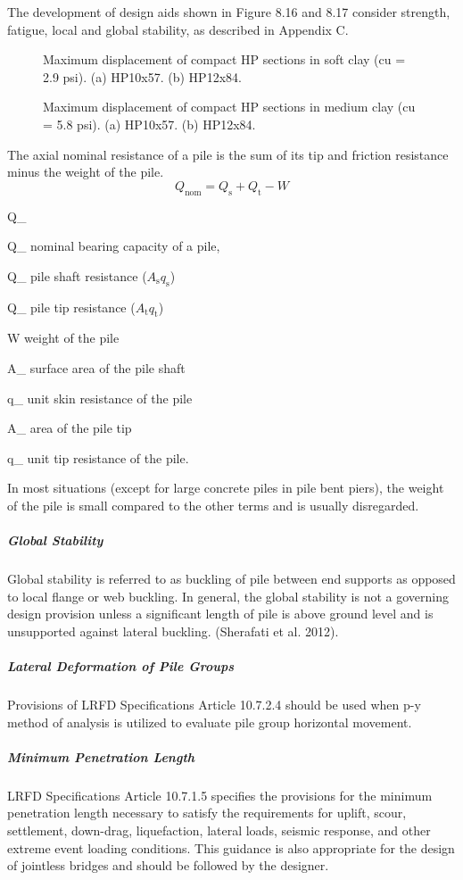 The development of design aids shown in Figure 8.16 and 8.17 consider strength, fatigue, local and global
stability, as described in Appendix C.

\begin{figure}
  \caption{Maximum displacement of compact HP sections in soft clay (cu = 2.9 psi). (a) HP10x57. (b) HP12x84.}
  \label{fig:maximum-displacement-soft-clay}
\end{figure}

\begin{figure}
  \caption{Maximum displacement of compact HP sections in medium clay (cu = 5.8 psi). (a) HP10x57. (b) HP12x84.}
  \label{fig:maximum-displacement-medium-clay}
\end{figure}

The axial nominal resistance of a pile is the sum of its tip and friction resistance minus the weight of the pile.
\begin{equation}
  Q_\text{nom} =Q_\text{s} + Q_\text{t} -W
\end{equation}
\begin{EqDesc}{Q_}
  \item [Q_\text{nom}]nominal bearing capacity of a pile,
  \item [Q_\text{s}] pile shaft resistance  ($A_\text{s}q_\text{s}$)
  \item [Q_\text{t}] pile tip resistance ($A_\text{t}q_\text{t}$)
  \item [W] weight of the pile
  \item [A_\text{s}] surface area of the pile shaft
  \item [q_\text{s}] unit skin resistance of the pile
  \item [A_\text{f}] area of the pile tip
  \item [q_\text{f}] unit tip resistance of the pile.
\end{EqDesc}

In most situations (except for large concrete piles in pile bent piers), the weight of the pile is small compared to
the other terms and is usually disregarded.

\subparagraph{Global Stability}
Global stability is referred to as buckling of pile between end supports as opposed to local flange or web buckling.
In general, the global stability is not a governing design provision unless a significant length of pile is above ground
level and is unsupported against lateral buckling. (Sherafati et al. 2012).
\subparagraph{Lateral Deformation of Pile Groups}
Provisions of LRFD Specifications Article 10.7.2.4 should be used when p-y method of analysis is utilized to
evaluate pile group horizontal movement.
\subparagraph{Minimum Penetration Length}
LRFD Specifications Article 10.7.1.5 specifies the provisions for the minimum penetration length necessary to
satisfy the requirements for uplift, scour, settlement, down-drag, liquefaction, lateral loads, seismic response, and
other extreme event loading conditions. This guidance is also appropriate for the design of jointless bridges and
should be followed by the designer.

